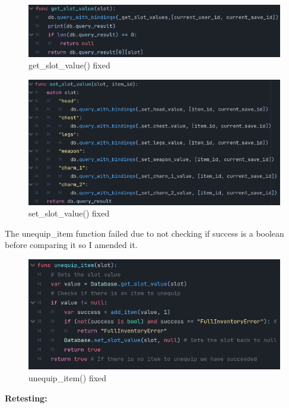 \documentclass{article}
\begin{document}
        \begin{multicols}{2}
        \begin{figure}[H]
                \centering
                \includegraphics[width = 0.8\columnwidth]{images/development/get_slot_value.PNG}
                \caption{get\_slot\_value() fixed}
        \end{figure}
        \begin{figure}[H]
                \centering
                \includegraphics[width = 0.8\columnwidth]{images/development/set_slot_value.PNG}
                \caption{set\_slot\_value() fixed}
        \end{figure}
        \end{multicols}
        \[\]
        The unequip\_item function failed due to not checking if success is a boolean before comparing it so I amended it.\\
        \begin{figure}[H]
                \centering
                \includegraphics[width = 0.8\columnwidth]{images/development/unequip_item_2.PNG}
                \caption{unequip\_item() fixed}
        \end{figure}
        \[\]
        \textbf{Retesting:}\\
\end{document}
